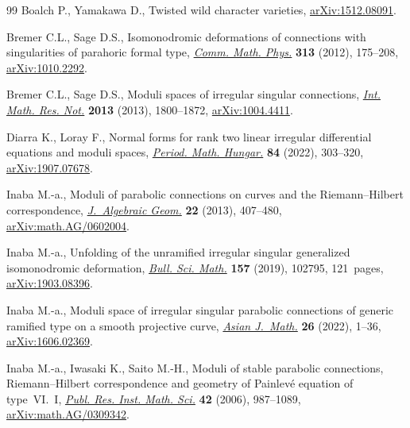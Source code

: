 \documentclass[pdftex]{sigma}
\numberwithin{equation}{section}
\begin{document}
\begin{thebibliography}{99}
Boalch P., Yamakawa D., Twisted wild character varieties, \href{https://arxiv.org/abs/1512.08091}{arXiv:1512.08091}.

Bremer C.L., Sage D.S., Isomonodromic deformations of connections with
 singularities of parahoric formal type, \href{https://doi.org/10.1007/s00220-012-1493-0}{\textit{Comm. Math. Phys.}}
 \textbf{313} (2012), 175--208, \href{https://arxiv.org/abs/1010.2292}{arXiv:1010.2292}.

Bremer C.L., Sage D.S., Moduli spaces of irregular singular connections,
 \href{https://doi.org/10.1093/imrn/rns103}{\textit{Int. Math. Res. Not.}} \textbf{2013} (2013), 1800--1872,
 \href{https://arxiv.org/abs/1004.4411}{arXiv:1004.4411}.

Diarra K., Loray F., Normal forms for rank two linear irregular differential
 equations and moduli spaces, \href{https://doi.org/10.1007/s10998-021-00408-8}{\textit{Period. Math. Hungar.}} \textbf{84}
 (2022), 303--320, \href{https://arxiv.org/abs/1907.07678}{arXiv:1907.07678}.

Inaba M.-a., Moduli of parabolic connections on curves and the
 {R}iemann--{H}ilbert correspondence, \href{https://doi.org/10.1090/S1056-3911-2013-00621-9}{\textit{J.~Algebraic Geom.}} \textbf{22}
 (2013), 407--480, \href{https://arxiv.org/abs/math.AG/0602004}{arXiv:math.AG/0602004}.

Inaba M.-a., Unfolding of the unramified irregular singular generalized
 isomonodromic deformation, \href{https://doi.org/10.1016/j.bulsci.2019.102795}{\textit{Bull. Sci. Math.}} \textbf{157} (2019),
 102795, 121~pages, \href{https://arxiv.org/abs/1903.08396}{arXiv:1903.08396}.

Inaba M.-a., Moduli space of irregular singular parabolic connections of generic
 ramified type on a smooth projective curve, \href{https://doi.org/10.4310/AJM.2022.v26.n1.a1}{\textit{Asian J.~Math.}}
 \textbf{26} (2022), 1--36, \href{https://arxiv.org/abs/1606.02369}{arXiv:1606.02369}.

Inaba M.-a., Iwasaki K., Saito M.-H., Moduli of stable parabolic connections,
 {R}iemann--{H}ilbert correspondence and geometry of {P}ainlev\'e equation of
 type~{VI}.~{I}, \href{https://doi.org/10.2977/PRIMS/1166642194}{\textit{Publ. Res. Inst. Math. Sci.}} \textbf{42} (2006),
 987--1089, \href{https://arxiv.org/abs/math.AG/0309342}{arXiv:math.AG/0309342}.


\end{thebibliography}
\end{document}
